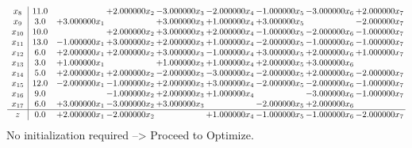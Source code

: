 \documentclass[10pt]{article}
\begin{document}
\[\begin{array}{c| c c@{\hskip 2pt} c@{\hskip 2pt} c@{\hskip 2pt} c@{\hskip 2pt} c@{\hskip 2pt} c@{\hskip 2pt} c@{\hskip 2pt} }
 x_{8}   &  11.0  &   & + 2.000000 x_{2} & -3.000000 x_{3} & -2.000000 x_{4} & -1.000000 x_{5} & -3.000000 x_{6} & + 2.000000 x_{7}\\
 x_{9}   &  3.0 & + 3.000000 x_{1} &   & + 3.000000 x_{3} & + 1.000000 x_{4} & + 3.000000 x_{5} &   & -2.000000 x_{7}\\
 x_{10}   &  10.0  &   & + 2.000000 x_{2} & + 3.000000 x_{3} & + 2.000000 x_{4} & -1.000000 x_{5} & -2.000000 x_{6} & -1.000000 x_{7}\\
 x_{11}   &  13.0 & -1.000000 x_{1} & + 3.000000 x_{2} & + 2.000000 x_{3} & + 1.000000 x_{4} & -2.000000 x_{5} & -1.000000 x_{6} & -1.000000 x_{7}\\
 x_{12}   &  6.0 & + 2.000000 x_{1} & + 2.000000 x_{2} & + 3.000000 x_{3} & -1.000000 x_{4} & + 3.000000 x_{5} & + 2.000000 x_{6} & + 1.000000 x_{7}\\
 x_{13}   &  3.0 & + 1.000000 x_{1} &   & + 1.000000 x_{3} & + 1.000000 x_{4} & + 2.000000 x_{5} & + 3.000000 x_{6} &   \\
 x_{14}   &  5.0 & + 2.000000 x_{1} & + 2.000000 x_{2} & -2.000000 x_{3} & -3.000000 x_{4} & -2.000000 x_{5} & + 2.000000 x_{6} & -2.000000 x_{7}\\
 x_{15}   &  12.0 & -2.000000 x_{1} & -1.000000 x_{2} & + 2.000000 x_{3} & + 3.000000 x_{4} & -2.000000 x_{5} & -2.000000 x_{6} & -1.000000 x_{7}\\
 x_{16}   &  9.0  &   & -1.000000 x_{2} & + 2.000000 x_{3} & + 1.000000 x_{4} &   & -3.000000 x_{6} & -1.000000 x_{7}\\
 x_{17}   &  6.0 & + 3.000000 x_{1} & -3.000000 x_{2} & + 3.000000 x_{3} &   & -2.000000 x_{5} & + 2.000000 x_{6} &   \\
\hline
z    &  0.0 & + 2.000000 x_{1} & -2.000000 x_{2} &   & + 1.000000 x_{4} & -1.000000 x_{5} & -1.000000 x_{6} & -2.000000 x_{7}\\
\end{array}\]
No initialization required --> Proceed to Optimize. 
\end{document}
